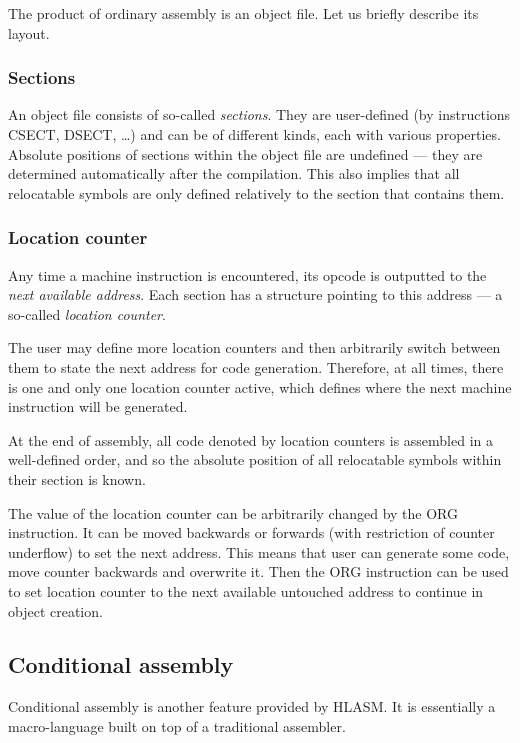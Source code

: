 The product of ordinary assembly is an object file. Let us briefly describe its layout.

\subsubsection{Sections}

An object file consists of so-called \emph{sections}. They are user-defined (by instructions CSECT, DSECT, \ldots) and can be of different kinds, each with various properties. Absolute positions of sections within the object file are undefined --- they are determined automatically after the compilation. This also implies that all relocatable symbols are only defined relatively to the section that contains them.

\subsubsection{Location counter}
\label{loctr}

Any time a machine instruction is encountered, its opcode is outputted to the \emph{next available address}. Each section has a structure pointing to this address --- a so-called \emph{location counter}.

The user may define more location counters and then arbitrarily switch between them to state the next address for code generation. Therefore, at all times, there is one and only one location counter active, which defines where the next machine instruction will be generated.

At the end of assembly, all code denoted by location counters is assembled in a well-defined order, and so the absolute position of all relocatable symbols within their section is known.

The value of the location counter can be arbitrarily changed by the ORG instruction. It can be moved backwards or forwards (with restriction of counter underflow) to set the next address. This means that user can generate some code, move counter backwards and overwrite it. Then the ORG instruction can be used to set location counter to the next available untouched address to continue in object creation.

\subsection{Conditional assembly}
\label{CA_proc}

Conditional assembly is another feature provided by HLASM. It is essentially a macro-language built on top of a traditional assembler.

